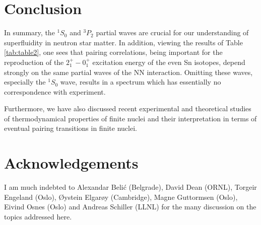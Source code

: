 \section{Conclusion} \label{sec:sec4}


In summary, the $^1S_0$ and $^3P_2$ partial waves are crucial for our
understanding of superfluidity in neutron star matter. In addition, viewing
the results of Table \ref{tab:table2}, one sees that 
pairing correlations, being important for the 
reproduction of the $2^+_1-0^+_1$ excitation energy of
the even Sn isotopes, depend strongly on the same  partial waves
of the NN interaction. Omitting these waves, especially the  $^1S_0$ wave,
results in a spectrum which has essentially no correspondence with experiment.

Furthermore, we have also discussed 
recent experimental and theoretical studies 
of thermodynamical properties of finite nuclei
and their interpretation in terms  of eventual pairing transitions 
in finite nuclei. 


\section*{Acknowledgements}
I am much indebted to Alexandar Beli{\'c} (Belgrade), 
David Dean (ORNL), Torgeir Engeland (Oslo), \O ystein Elgar\o y (Cambridge),
Magne Guttormsen (Oslo), Eivind Osnes (Oslo)  
and Andreas Schiller (LLNL) 
for the many discussion on the topics addressed here.

